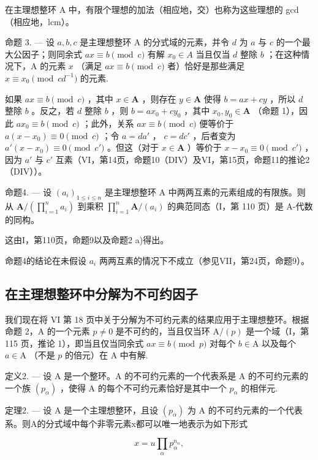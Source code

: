 在主理想整环 A 中，有限个理想的加法（相应地，交）也称为这些理想的 gcd（相应地，lcm）。

命题 3. --- 设 \(a, b, c\) 是主理想整环 A 的分式域的元素，并令 \(d\) 为 \(a\) 与 \(c\) 的一个最大公因子；则同余式 \(ax \equiv b \pmod{c}\) 有解 \(x_0 \in A\) 当且仅当 \(d\) 整除 \(b\) ；在这种情况下，A 的元素 \(x\) （满足 \(ax \equiv b \pmod{c}\) 者）恰好是那些满足 \(x \equiv x_0 \pmod{cd^{-1}}\) 的元素.

如果 \(ax \equiv b \pmod{c}\) ，其中 \(x \in \mathbf{A}\) ，则存在 \(y \in \mathbf{A}\) 使得 \(b = ax + cy\) ，所以 \(d\) 整除 \(b\) 。反之，若 \(d\) 整除 \(b\) ，则 \(b = ax_0 + cy_0\) ，其中 \(x_0, y_0 \in \mathbf{A}\) （命题 1），因此 \(ax_0 \equiv b \pmod{c}\) ；此外，关系 \(ax \equiv b \pmod{c}\) 便等价于 \(a(x - x_0) \equiv 0 \pmod{c}\) ；令 \(a = da'\) ， \(c = dc'\) ，后者变为 \(a'(x - x_0) \equiv 0 \pmod{c'}\) 。但这（对于 \(x \in \mathbf{A}\) ）等价于 \(x - x_0 \equiv 0 \pmod{c'}\) ，因为 \(a'\) 与 \(c'\) 互素（VI，第14页，命题10（DIV）及VI，第15页，命题11的推论2（DIV））。

命题4. --- 设 \((a_i)_{1 \leq i \leq n}\) 是主理想整环 A 中两两互素的元素组成的有限族。则从 \(\mathbf{A}/\left(\prod_{i=1}^{n} a_i\right)\) 到乘积 \(\prod_{i=1}^{n} \mathbf{A}/(a_i)\) 的典范同态（I，第 110 页）是 A-代数的同构。

这由I，第110页，命题9以及命题2 a)得出。

命题4的结论在未假设 \(a_{i}\) 两两互素的情况下不成立（参见VII，第24页，命题9）。

\subsection{在主理想整环中分解为不可约因子}

我们现在将 VI 第 18 页中关于分解为不可约元素的结果应用于主理想整环。根据命题 2，A 的一个元素 \(p \neq 0\) 是不可约的，当且仅当环 \(\mathrm{A}/(p)\) 是一个域（I，第 115 页，推论 1），即当且仅当同余式 \(ax \equiv b \pmod{p}\) 对每个 \(b \in \mathrm{A}\) 以及每个 \(a \in \mathrm{A}\) （不是 \(p\) 的倍元）在 A 中有解.

定义2. --- 设 A 是一个整环。A 的不可约元素的一个代表系是 A 的不可约元素的一个族 \((p_{\alpha})\) ，使得 A 的每个不可约元素恰好是其中一个 \(p_{\alpha}\) 的相伴元.

定理2. --- 设 A 是一个主理想整环，且设 \((p_{\alpha})\) 为 A 的不可约元素的一个代表系。则A的分式域中每个非零元素x都可以唯一地表示为如下形式

\[
x = u \prod_ {\alpha} p _ {\alpha} ^ {n _ {\alpha}},\tag{1}
\]

